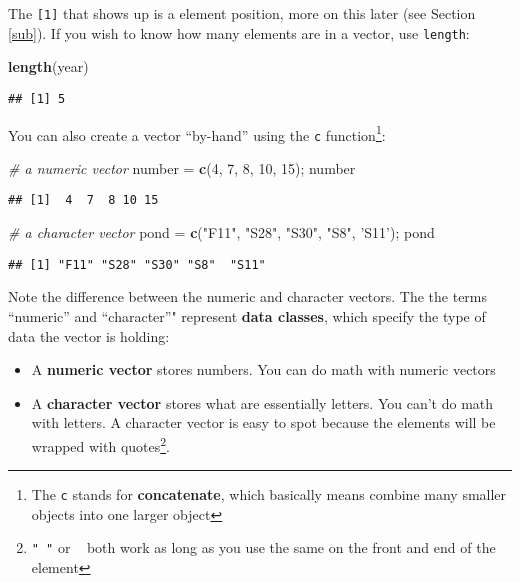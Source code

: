 \documentclass[]{book}
\newenvironment{Shaded}{\begin{snugshade}}{\end{snugshade}}
\newcommand{\KeywordTok}[1]{\textcolor[rgb]{0.13,0.29,0.53}{\textbf{#1}}}
\newcommand{\DecValTok}[1]{\textcolor[rgb]{0.00,0.00,0.81}{#1}}
\newcommand{\StringTok}[1]{\textcolor[rgb]{0.31,0.60,0.02}{#1}}
\newcommand{\CommentTok}[1]{\textcolor[rgb]{0.56,0.35,0.01}{\textit{#1}}}
\newcommand{\NormalTok}[1]{#1}
\providecommand{\tightlist}{%
  \setlength{\itemsep}{0pt}\setlength{\parskip}{0pt}}
\let\rmarkdownfootnote\footnote%
\def\footnote{\protect\rmarkdownfootnote}
\theoremstyle{definition}
\theoremstyle{definition}
\theoremstyle{definition}
\theoremstyle{remark}
\begin{document}
The \texttt{{[}1{]}} that shows up is a element position, more on this
later (see Section \ref{sub}). If you wish to know how many elements are
in a vector, use \texttt{length}:

\begin{Shaded}
\begin{Highlighting}[]
\KeywordTok{length}\NormalTok{(year)}
\end{Highlighting}
\end{Shaded}

\begin{verbatim}
## [1] 5
\end{verbatim}

You can also create a vector ``by-hand'' using the \texttt{c}
function\footnote{The \texttt{c} stands for \textbf{concatenate}, which
  basically means combine many smaller objects into one larger object}:

\begin{Shaded}
\begin{Highlighting}[]
\CommentTok{# a numeric vector}
\NormalTok{number =}\StringTok{ }\KeywordTok{c}\NormalTok{(}\DecValTok{4}\NormalTok{, }\DecValTok{7}\NormalTok{, }\DecValTok{8}\NormalTok{, }\DecValTok{10}\NormalTok{, }\DecValTok{15}\NormalTok{); number}
\end{Highlighting}
\end{Shaded}

\begin{verbatim}
## [1]  4  7  8 10 15
\end{verbatim}

\begin{Shaded}
\begin{Highlighting}[]
\CommentTok{# a character vector}
\NormalTok{pond =}\StringTok{ }\KeywordTok{c}\NormalTok{(}\StringTok{"F11"}\NormalTok{, }\StringTok{"S28"}\NormalTok{, }\StringTok{"S30"}\NormalTok{, }\StringTok{"S8"}\NormalTok{, }\StringTok{'S11'}\NormalTok{); pond}
\end{Highlighting}
\end{Shaded}

\begin{verbatim}
## [1] "F11" "S28" "S30" "S8"  "S11"
\end{verbatim}

Note the difference between the numeric and character vectors. The the
terms ``numeric'' and ``character''" represent \textbf{data classes},
which specify the type of data the vector is holding:

\begin{itemize}
\tightlist
\item
  A \textbf{numeric vector} stores numbers. You can do math with numeric
  vectors
\item
  A \textbf{character vector} stores what are essentially letters. You
  can't do math with letters. A character vector is easy to spot because
  the elements will be wrapped with quotes\footnote{\texttt{"\ "} or
    \texttt{\textquotesingle{}\ \textquotesingle{}} both work as long as
    you use the same on the front and end of the element}.
\end{itemize}
\end{document}
